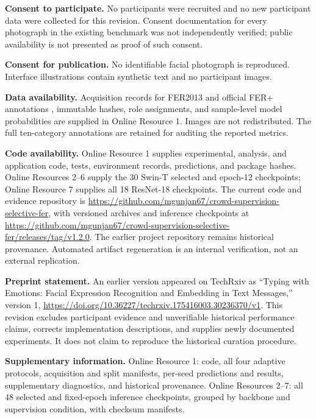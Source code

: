 \documentclass[pdflatex,sn-mathphys-num]{sn-jnl}
\begin{document}
\noindent\textbf{Consent to participate.} No participants were recruited and no new participant data were collected for this revision. Consent documentation for every photograph in the existing benchmark was not independently verified; public availability is not presented as proof of such consent.

\noindent\textbf{Consent for publication.} No identifiable facial photograph is reproduced. Interface illustrations contain synthetic text and no participant images.

\noindent\textbf{Data availability.} Acquisition records for FER2013 \cite{goodfellow2013fer} and official FER+ annotations \cite{barsoum2016ferplus}, immutable hashes, role assignments, and sample-level model probabilities are supplied in Online Resource 1. Images are not redistributed. The full ten-category annotations are retained for auditing the reported metrics.

\noindent\textbf{Code availability.} Online Resource 1 supplies experimental, analysis, and application code, tests, environment records, predictions, and package hashes. Online Resources 2--6 supply the 30 Swin-T selected and epoch-12 checkpoints; Online Resource 7 supplies all 18 ResNet-18 checkpoints. The current code and evidence repository is \url{https://github.com/mgunjan67/crowd-supervision-selective-fer}, with versioned archives and inference checkpoints at \url{https://github.com/mgunjan67/crowd-supervision-selective-fer/releases/tag/v1.2.0}. The earlier project repository remains historical provenance. Automated artifact regeneration is an internal verification, not an external replication.

\noindent\textbf{Preprint statement.} An earlier version appeared on TechRxiv as ``Typing with Emotions: Facial Expression Recognition and Embedding in Text Messages,'' version 1, \url{https://doi.org/10.36227/techrxiv.175416003.30236370/v1}. This revision excludes participant evidence and unverifiable historical performance claims, corrects implementation descriptions, and supplies newly documented experiments. It does not claim to reproduce the historical curation procedure.

\noindent\textbf{Supplementary information.} Online Resource 1: code, all four adaptive protocols, acquisition and split manifests, per-seed predictions and results, supplementary diagnostics, and historical provenance. Online Resources 2--7: all 48 selected and fixed-epoch inference checkpoints, grouped by backbone and supervision condition, with checksum manifests.


\end{document}
